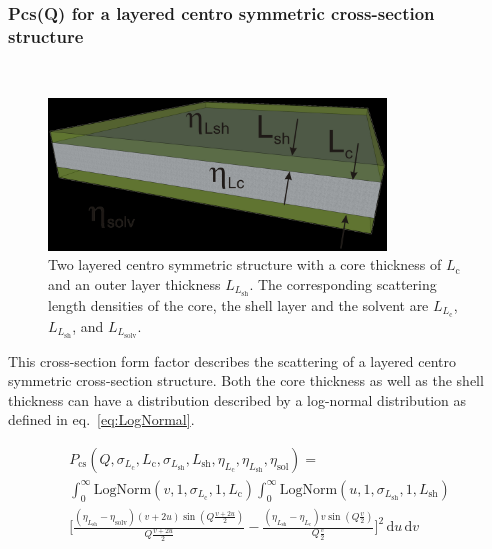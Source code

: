 \clearpage
\subsubsection{Pcs(Q) for a layered centro symmetric cross-section structure} ~\\
\label{plugin:Pcs:LayeredCentroSymmetricCrossSectionStructure}

\begin{figure}[htb]
\begin{center}
\includegraphics[width=0.8\textwidth,height=0.361\textwidth]{../images/form_factor/anisotropic/planar2centrosymm_txt.png}
\end{center}
\caption{Two layered centro symmetric structure with a core thickness of $L_\textrm{c}$ and an outer layer thickness
$L_{L_\textrm{sh}}$. The corresponding scattering length densities of the core, the shell layer and the solvent are
$L_{L_\textrm{c}}$, $L_{L_\textrm{sh}}$, and $L_{L_\textrm{solv}}$.}
\label{fig:Pcs:LayeredCentroSymmetricCrossSection}
\end{figure}

This cross-section form factor describes the scattering of a layered centro symmetric cross-section structure.
Both the core thickness as well as the shell thickness can have a distribution described by a log-normal distribution as defined in eq.\ \ref{eq:LogNormal}.

\begin{multline}
P_\text{cs}(Q,\sigma_{L_\textrm{c}},L_\textrm{c},\sigma_{L_\textrm{sh}},L_\textrm{sh},\eta_{L_\textrm{c}},\eta_{L_\textrm{sh}},\eta_\textrm{sol}) = \\
\int_0^\infty \textrm{LogNorm}(v,1,\sigma_{L_\textrm{c}},1,L_\textrm{c})
\int_0^\infty \textrm{LogNorm}(u,1,\sigma_{L_\textrm{sh}},1,L_\textrm{sh}) \\
     \Bigg[ \frac{(\eta_{L_\textrm{sh}}-\eta_\textrm{solv})(v+2u) \sin\left(Q\frac{v+2u}{2}\right)}{Q\frac{v+2u}{2}}
          -\frac{(\eta_{L_\textrm{sh}}-\eta_{L_\textrm{c}})  v   \sin\left(Q \frac{v}{2}\right)}{Q \frac{v}{2}}
    \Bigg]^2 \,
\textrm{d}u \, \textrm{d}v
\end{multline}

